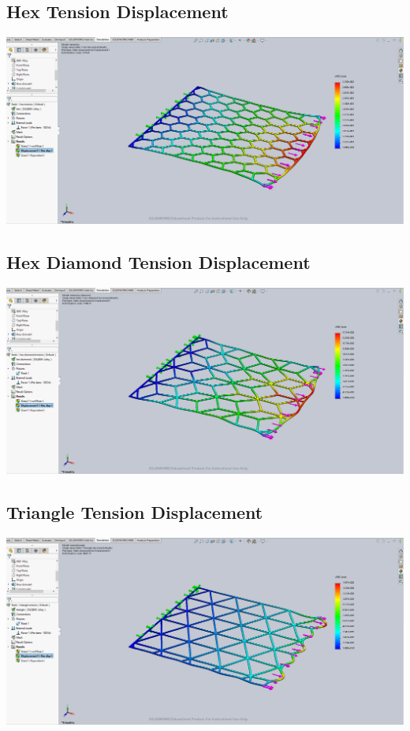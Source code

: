 \documentclass[12pt, letterpaper]{article}
\begin{document}
\begin{singlespace}
\subsection{Hex Tension Displacement}
\label{ap:h-te-d}
\includegraphics[width=0.8\linewidth]{./graphs/tension/hex-tension-displacement}

\subsection{Hex Diamond Tension Displacement}
\label{ap:hd-te-d}
\includegraphics[width=0.8\linewidth]{./graphs/tension/hex-diamond-tension-displacement}

\subsection{Triangle Tension Displacement}
\label{ap:t-te-d}
\includegraphics[width=0.8\linewidth]{./graphs/tension/triangle-tension-displacement}




\end{singlespace}
\end{document}
